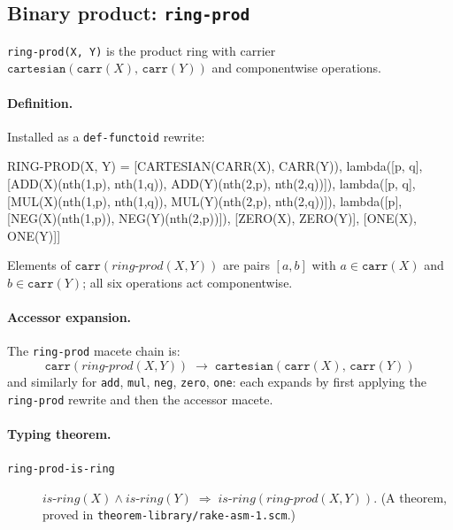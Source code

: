 \subsection{Binary product: \texttt{ring-prod}}

\texttt{ring-prod(X,~Y)} is the product ring with carrier
$\mathtt{cartesian}(\mathtt{carr}(X),\,\mathtt{carr}(Y))$ and
componentwise operations.

\paragraph{Definition.}
Installed as a \texttt{def-functoid} rewrite:

\begin{VNBsnip}
RING-PROD(X, Y) =
  [CARTESIAN(CARR(X), CARR(Y)),
   lambda([p, q], [ADD(X)(nth(1,p), nth(1,q)),
                   ADD(Y)(nth(2,p), nth(2,q))]),
   lambda([p, q], [MUL(X)(nth(1,p), nth(1,q)),
                   MUL(Y)(nth(2,p), nth(2,q))]),
   lambda([p],    [NEG(X)(nth(1,p)),
                   NEG(Y)(nth(2,p))]),
   [ZERO(X), ZERO(Y)],
   [ONE(X),  ONE(Y)]]
\end{VNBsnip}

Elements of $\mathtt{carr}(\mathit{ring\text{-}prod}(X,Y))$ are pairs $[a,b]$
with $a \in \mathtt{carr}(X)$ and $b \in \mathtt{carr}(Y)$;
all six operations act componentwise.

\paragraph{Accessor expansion.}
The \texttt{ring-prod} macete chain is:
\[
  \mathtt{carr}(\mathit{ring\text{-}prod}(X,Y))
  \;\longrightarrow\; \mathtt{cartesian}(\mathtt{carr}(X),\,\mathtt{carr}(Y))
\]
and similarly for \texttt{add}, \texttt{mul}, \texttt{neg}, \texttt{zero},
\texttt{one}: each expands by first applying the \texttt{ring-prod}
rewrite and then the accessor macete.

\paragraph{Typing theorem.}
\begin{description}
\item[\texttt{ring-prod-is-ring}]
  $\mathit{is\text{-}ring}(X) \wedge \mathit{is\text{-}ring}(Y)
  \;\Rightarrow\; \mathit{is\text{-}ring}(\mathit{ring\text{-}prod}(X,Y))$.
  (A theorem, proved in \texttt{theorem-library/rake-asm-1.scm}.)
\end{description}


